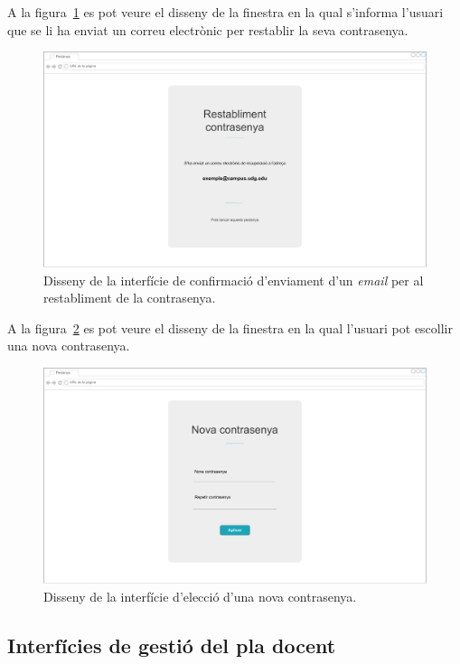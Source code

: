 \documentclass[a4paper,12pt]{ThesisStyle}
\begin{document}
A la figura~\ref{img:passwordRestablished} es pot veure el disseny de la finestra en la qual s'informa l'usuari que se li ha enviat un correu electrònic per restablir la seva contrasenya.
\begin{figure}[H]
	\centering
	\includegraphics[width=\textwidth]{assets/interfaces/auth/passwordRestablished.pdf}
	\caption{\label{img:passwordRestablished}Disseny de la interfície de confirmació d'enviament d'un \textit{email} per al restabliment de la contrasenya.}
\end{figure}

A la figura~\ref{img:newPassword} es pot veure el disseny de la finestra en la qual l'usuari pot escollir una nova contrasenya.
\begin{figure}[H]
	\centering
	\includegraphics[width=\textwidth]{assets/interfaces/auth/newPassword.pdf}
	\caption{\label{img:newPassword}Disseny de la interfície d'elecció d'una nova contrasenya.}
\end{figure}

\subsection{Interfícies de gestió del pla docent}
\label{subsec:interficies_plaDocent}
\end{document}
